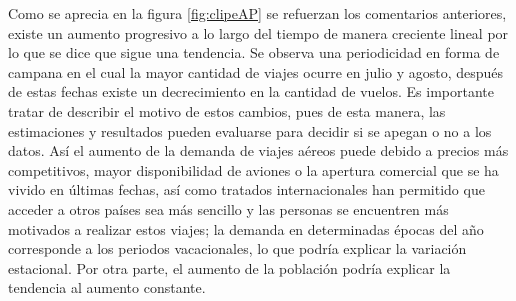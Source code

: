\documentclass[
  spanish,
]{book}
\theoremstyle{remark}
\begin{document}
Como se aprecia en la figura \ref{fig:clipeAP} se refuerzan los comentarios anteriores, existe un aumento progresivo a lo largo del tiempo de manera creciente lineal por lo que se dice que sigue una tendencia. Se observa una periodicidad en forma de campana en el cual la mayor cantidad de viajes ocurre en julio y agosto, después de estas fechas existe un decrecimiento en la cantidad de vuelos.
Es importante tratar de describir el motivo de estos cambios, pues de esta manera, las estimaciones y resultados pueden evaluarse para decidir si se apegan o no a los datos. Así el aumento de la demanda de viajes aéreos puede debido a precios más competitivos, mayor disponibilidad de aviones o la apertura comercial que se ha vivido en últimas fechas, así como tratados internacionales han permitido que acceder a otros países sea más sencillo y las personas se encuentren más motivados a realizar estos viajes; la demanda en determinadas épocas del año corresponde a los periodos vacacionales, lo que podría explicar la variación estacional. Por otra parte, el aumento de la población podría explicar la tendencia al aumento constante.

  
\end{document}
